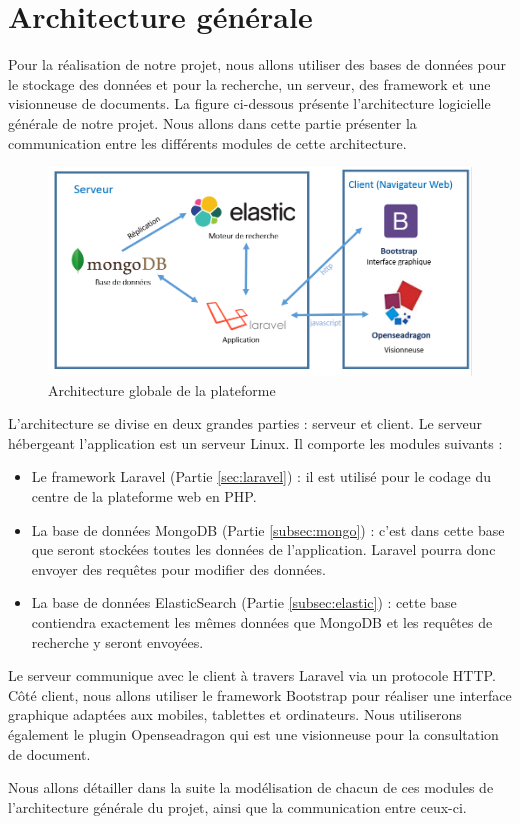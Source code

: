 \newpage
\section{Architecture générale}
\label{sec:generale}

Pour la réalisation de notre projet, nous allons utiliser des bases de données pour le stockage des données et pour la recherche, un serveur, des framework et une visionneuse de documents. La figure ci-dessous présente l'architecture logicielle générale de notre projet. Nous allons dans cette partie présenter la communication entre les différents modules de cette architecture.
    \begin{figure}[H]
        \centering
        \includegraphics[width=\textwidth]{figure/Archi.png}
            \caption{Architecture globale de la plateforme}
            \label{archi}
    \end{figure}

L'architecture se divise en deux grandes parties : serveur et client. 
Le serveur hébergeant l'application est un serveur Linux. Il comporte les modules suivants :
\begin{itemize}
	\item Le framework Laravel (Partie \ref{sec:laravel}) : il est utilisé pour le codage du centre de la plateforme web en PHP.
	\item La base de données MongoDB (Partie \ref{subsec:mongo}) : c'est dans cette base que seront stockées toutes les données de l'application. Laravel pourra donc envoyer des requêtes pour modifier des données.
	\item La base de données ElasticSearch (Partie \ref{subsec:elastic}) : cette base contiendra exactement les mêmes données que MongoDB et les requêtes de recherche y seront envoyées.
\end{itemize}

Le serveur communique avec le client à travers Laravel via un protocole HTTP. Côté client, nous allons utiliser le framework Bootstrap pour réaliser une interface graphique adaptées aux mobiles, tablettes et ordinateurs. Nous utiliserons également le plugin Openseadragon qui est une visionneuse pour la consultation de document. 

Nous allons détailler dans la suite la modélisation de chacun de ces modules de l'architecture générale du projet, ainsi que la communication entre ceux-ci.
